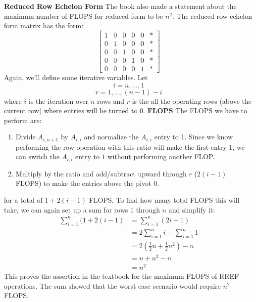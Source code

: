 \documentclass{article}
\begin{document}
\newline
\pagebreak
\newline
{\Large{\bf{Reduced Row Echelon Form}}}
\newline
\newline
The book also made a statement about the maximum number of FLOPS for reduced form to be $n^2$. The reduced row echelon form matrix has the form:
\newline
\[
\begin{bmatrix}
1 & 0 & 0 & 0 & 0 & * \\
0 & 1 & 0 & 0 & 0 & * \\
0 & 0 & 1 & 0 & 0 & * \\
0 & 0 & 0 & 1 & 0 & * \\
0 & 0 & 0 & 0 & 1 & * 
\end{bmatrix}
\]
\newline
\newline
Again, we'll define some iterative variables. Let
\[i=n,\ldots,1\] 
\[r=1,\ldots,(n-1)-i\] 
\newline
where $i$ is the iteration over $n$ rows and $r$ is the all the operating rows (above the current row) where entries will be turned to $0$. 
\newline
\newline
{\large{\bf{FLOPS}}}
\newline
\newline
The FLOPS we have to perform are:
\begin{enumerate}
  \item Divide $A_{i,n+1}$ by $A_{i,i}$ and normalize the $A_{i,i}$ entry to 1. Since we know performing the row operation with this ratio will make the first entry $1$, we can switch the $A_{i,i}$ entry to $1$ without performing another FLOP. 
  \item Multiply by the ratio and add/subtract upward through $r$ ($2(i-1)$ FLOPS) to make the entries above the pivot $0$.
\end{enumerate} 
for a total of $1+2(i-1)$ FLOPS. To find how many total FLOPS this will take, we can again set up a sum for rows $1$ through $n$ and simplify it:
\begin{align*}
\sum_{i=1}^{n}(1+2(i-1)&=\sum_{i=1}^{n}(2i-1) \\
&=2\sum_{i=1}^{n}i-\sum_{i=1}^{n}1 \\
&=2(\frac{1}{2}n+\frac{1}{2}n^2)-n \\
&=n+n^2-n \\
&=n^2
\end{align*}
\newline
This proves the assertion in the textbook for the maximum FLOPS of RREF operations. The sum showed that the worst case scenario would require $n^2$ FLOPS.
\end{document}
